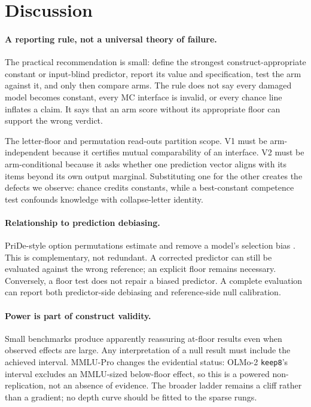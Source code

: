 \section{Discussion}

\paragraph{A reporting rule, not a universal theory of failure.}
The practical recommendation is small: define the strongest construct-appropriate constant or input-blind predictor, report its value and specification, test the arm against it, and only then compare arms. The rule does not say every damaged model becomes constant, every MC interface is invalid, or every chance line inflates a claim. It says that an arm score without its appropriate floor can support the wrong verdict.

The letter-floor and permutation read-outs partition scope. V1 must be arm-independent because it certifies mutual comparability of an interface. V2 must be arm-conditional because it asks whether one prediction vector aligns with its items beyond its own output marginal. Substituting one for the other creates the defects we observe: chance credits constants, while a best-constant competence test confounds knowledge with collapse-letter identity.

\paragraph{Relationship to prediction debiasing.}
PriDe-style option permutations estimate and remove a model's selection bias \citep{zheng2024selectors}. This is complementary, not redundant. A corrected predictor can still be evaluated against the wrong reference; an explicit floor remains necessary. Conversely, a floor test does not repair a biased predictor. A complete evaluation can report both predictor-side debiasing and reference-side null calibration.

\paragraph{Power is part of construct validity.}
Small benchmarks produce apparently reassuring at-floor results even when observed effects are large. Any interpretation of a null result must include the achieved interval. MMLU-Pro changes the evidential status: OLMo-2 \texttt{keep8}'s interval excludes an MMLU-sized below-floor effect, so this is a powered non-replication, not an absence of evidence. The broader ladder remains a cliff rather than a gradient; no depth curve should be fitted to the sparse rungs.

